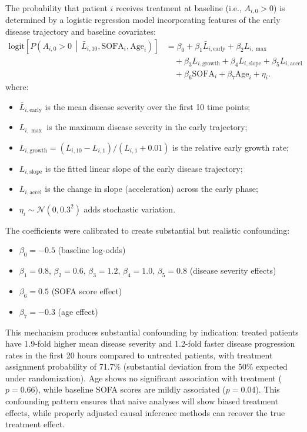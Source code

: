 The probability that patient $i$ receives treatment at baseline (i.e., $A_{i,0} > 0$) is determined by a logistic regression model incorporating features of the early disease trajectory and baseline covariates:
\begin{equation}
\begin{aligned}
\text{logit}\!\left[
P\!\left(A_{i,0} > 0 \,\middle|\, \bar{L}_{i,10}, \text{SOFA}_i, \text{Age}_i\right)
\right]
&= \beta_0 
+ \beta_1 \bar{L}_{i,\mathrm{early}} 
+ \beta_2 L_{i,\max} \\
&\quad
+ \beta_3 L_{i,\mathrm{growth}}
+ \beta_4 L_{i,\mathrm{slope}}
+ \beta_5 L_{i,\mathrm{accel}} \\
&\quad
+ \beta_6 \text{SOFA}_i 
+ \beta_7 \text{Age}_i 
+ \eta_i .
\end{aligned}
\end{equation}
where:
\begin{itemize}
    \item $\bar{L}_{i,\mathrm{early}}$ is the mean disease severity over the first 10 time points;
    \item $L_{i,\max}$ is the maximum disease severity in the early trajectory;
    \item $L_{i,\mathrm{growth}} = (L_{i,10} - L_{i,1}) / (L_{i,1} + 0.01)$ is the relative early growth rate;
    \item $L_{i,\mathrm{slope}}$ is the fitted linear slope of the early disease trajectory;
    \item $L_{i,\mathrm{accel}}$ is the change in slope (acceleration) across the early phase;
    \item $\eta_i \sim \mathcal{N}(0, 0.3^2)$ adds stochastic variation.
\end{itemize}

The coefficients were calibrated to create substantial but realistic confounding:
\begin{itemize}
    \item $\beta_0 = -0.5$ (baseline log-odds)
    \item $\beta_1 = 0.8$, $\beta_2 = 0.6$, $\beta_3 = 1.2$, $\beta_4 = 1.0$, $\beta_5 = 0.8$ (disease severity effects)
    \item $\beta_6 = 0.5$ (SOFA score effect)
    \item $\beta_7 = -0.3$ (age effect)
\end{itemize}

This mechanism produces substantial confounding by indication: treated patients have 1.9-fold higher mean disease severity and 1.2-fold faster disease progression rates in the first 20 hours compared to untreated patients, with treatment assignment probability of 71.7\% (substantial deviation from the 50\% expected under randomization). 
Age shows no significant association with treatment ($p = 0.66$), while baseline SOFA scores are mildly associated ($p = 0.04$). 
This confounding pattern ensures that naive analyses will show biased treatment effects, while properly adjusted causal inference methods can recover the true treatment effect.

